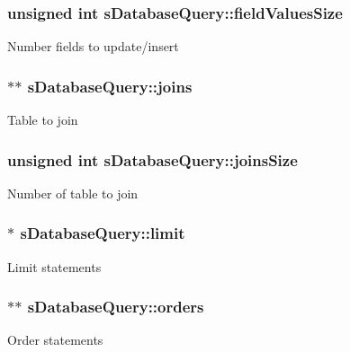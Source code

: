 \subsubsection[{\texorpdfstring{field\+Values\+Size}{fieldValuesSize}}]{\setlength{\rightskip}{0pt plus 5cm}unsigned int s\+Database\+Query\+::field\+Values\+Size}\hypertarget{structsDatabaseQuery_aa203f0cb4e33b39d48e6674250d9f74d}{}\label{structsDatabaseQuery_aa203f0cb4e33b39d48e6674250d9f74d}
Number fields to update/insert 
\subsubsection[{\texorpdfstring{joins}{joins}}]{$\ast$$\ast$ s\+Database\+Query\+::joins}\hypertarget{structsDatabaseQuery_aa66192f20c6390fd1bd5f2db96860926}{}\label{structsDatabaseQuery_aa66192f20c6390fd1bd5f2db96860926}
Table to join 
\subsubsection[{\texorpdfstring{joins\+Size}{joinsSize}}]{\setlength{\rightskip}{0pt plus 5cm}unsigned int s\+Database\+Query\+::joins\+Size}\hypertarget{structsDatabaseQuery_aca409db9b76aea5d1e83390e2a251fd3}{}\label{structsDatabaseQuery_aca409db9b76aea5d1e83390e2a251fd3}
Number of table to join 
\subsubsection[{\texorpdfstring{limit}{limit}}]{$\ast$ s\+Database\+Query\+::limit}\hypertarget{structsDatabaseQuery_aeca8178bae8fc02faae2bf64d6e7455a}{}\label{structsDatabaseQuery_aeca8178bae8fc02faae2bf64d6e7455a}
Limit statements 
\subsubsection[{\texorpdfstring{orders}{orders}}]{$\ast$$\ast$ s\+Database\+Query\+::orders}\hypertarget{structsDatabaseQuery_a4f2d3a55d0e7fcd151f7650c08ff7975}{}\label{structsDatabaseQuery_a4f2d3a55d0e7fcd151f7650c08ff7975}
Order statements 
